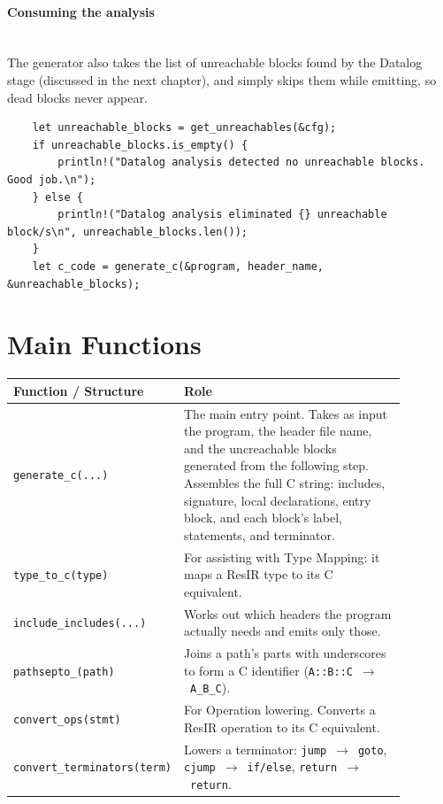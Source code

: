 \documentclass[11pt,a4paper,oneside]{report}
\begin{document}
	\paragraph{Consuming the analysis}\mbox{}\\
	The generator also takes the list of unreachable blocks found by the Datalog stage (discussed in the next chapter), and simply skips them while emitting, so dead blocks never appear.
	
	\begin{lstlisting}
	let unreachable_blocks = get_unreachables(&cfg);
	if unreachable_blocks.is_empty() {
		println!("Datalog analysis detected no unreachable blocks. Good job.\n");
	} else {
		println!("Datalog analysis eliminated {} unreachable block/s\n", unreachable_blocks.len());
	}
	let c_code = generate_c(&program, header_name, &unreachable_blocks);
	\end{lstlisting}
		
	\section{Main Functions}
	
	\begin{longtable}{p{0.30\linewidth}p{0.58\linewidth}}
		\toprule
		\textbf{Function / Structure} & \textbf{Role} \\
		\midrule
		\endhead
		
		\texttt{generate\_c(...)} &
		The main entry point. Takes as input the program, the header file name, and the uncreachable blocks generated from the following step. Assembles the full C string: includes, signature, local declarations, entry block, and each block's label, statements, and terminator.\\
		\midrule
		
		\texttt{type\_to\_c(type)} &
		For assisting with Type Mapping: it maps a ResIR type to its C equivalent. \\
		\midrule
		
		\texttt{include\_includes(...)} &
		Works out which headers the program actually needs and emits only those. \\
		\midrule
		
		\texttt{pathsepto\_(path)} &
		Joins a path's parts with underscores to form a C identifier (\texttt{A::B::C}~$\rightarrow$~\texttt{A\_B\_C}). \\
		\midrule
		
		\texttt{convert\_ops(stmt)} &
		For Operation lowering. Converts a ResIR operation to its C equivalent.\\
		\midrule
		
		\texttt{convert\_terminators(term)} &
		Lowers a terminator: \texttt{jump}~$\rightarrow$~\texttt{goto}, \texttt{cjump}~$\rightarrow$~\texttt{if/else}, \texttt{return}~$\rightarrow$~\texttt{return}. \\
		
		\bottomrule
	\end{longtable}
\end{document}
